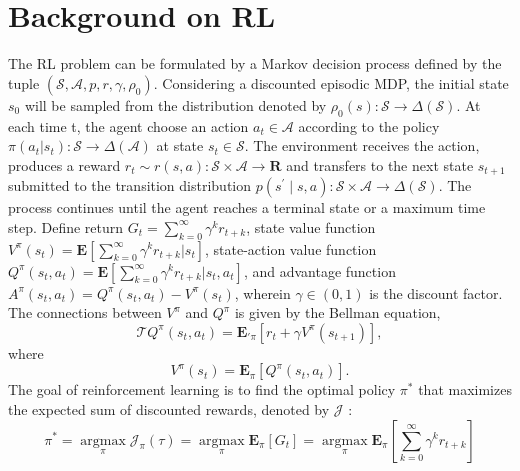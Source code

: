 \documentclass[nohyperref]{article}
\theoremstyle{plain}
\begin{document}
\clearpage
\section{Background on RL}
\label{app: background on RL}

 The RL problem can be formulated by a Markov decision process \citep[MDP]{howard1960dynamic} defined by the tuple  $\left(\mathcal{S}, \mathcal{A}, p, r, \gamma, \rho_{0}\right)$. 
 Considering a discounted episodic MDP, the initial state $s_0$ will be sampled from the distribution denoted by $\rho_0(s): \mathcal{S} \rightarrow \Delta(\mathcal{S})$. 
 At each time t, the agent choose an action $a_t \in \mathcal{A}$ according to the policy $\pi(a_t|s_t): \mathcal{S} \rightarrow \Delta(\mathcal{A})$ at state $s_t \in \mathcal{S}$. 
 The environment receives the action, produces a reward $r_t \sim r(s,a): \mathcal{S} \times \mathcal{A} \rightarrow \mathbf{R}$ and transfers to the next state $s_{t+1}$  submitted to the transition distribution $p\left(s^{\prime} \mid s, a\right): \mathcal{S} \times \mathcal{A} \rightarrow \Delta(\mathcal{S})$. 
 The process continues until the agent reaches a terminal state or a maximum time step. 
 Define return $G_t = \sum_{k=0}^\infty \gamma^k r_{t+k}$, state value function $V^{\pi}(s_t) = \textbf{E}\left[ \sum_{k=0}^\infty \gamma^k r_{t+k} | s_t \right]$, state-action value function $Q^{\pi}(s_t, a_t) = \textbf{E}\left[ \sum_{k=0}^\infty \gamma^k r_{t+k} | s_t, a_t \right]$, and advantage function $A^{\pi}(s_t,a_t) = Q^{\pi}(s_t, a_t) - V^{\pi}(s_t)$, wherein $\gamma \in(0,1)$ is the discount factor.
The connections between $V^\pi$ and $Q^\pi$ is given by the Bellman equation,
\begin{equation*}
    \mathcal{T}Q^{\pi} (s_t, a_t) = \textbf{E}_{'\pi} [r_t + \gamma V^{\pi}(s_{t+1})],
\end{equation*}
where
\begin{equation*}
    V^{\pi} (s_t)  = \textbf{E}_{\pi} [Q^{\pi} (s_t, a_t)].
\end{equation*}
The goal of reinforcement learning is to find the optimal policy $\pi^*$ that maximizes the expected sum of discounted rewards, denoted by $\mathcal{J}$ \citep{sutton}:
\begin{equation*}
\pi^{*}=\underset{\pi}{\operatorname{argmax}} \mathcal{J}_{\pi}(\tau) = \underset{\pi}{\operatorname{argmax}} \textbf{E}_{\pi}\left[G_{t}\right]= \underset{\pi}{\operatorname{argmax}} \textbf{E}_{\pi}[\sum_{k=0}^{\infty} \gamma^{k} r_{t+k}]
\end{equation*}
\end{document}
